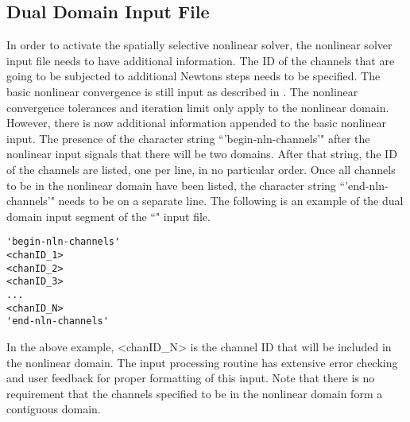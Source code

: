 \subsection{Dual Domain Input File}
\label{subsect:domDecompInputFile}

In order to activate the spatially selective nonlinear solver, the nonlinear solver input file needs to have additional information.
The ID of the channels that are going to be subjected to additional Newtons steps needs to be specified.
The basic nonlinear convergence is still input as described in .
The nonlinear convergence tolerances and iteration limit only apply to the nonlinear domain.
However, there is now additional information appended to the basic nonlinear input.
The presence of the character string ``'begin-nln-channels'" after the nonlinear input signals that there will be two domains.
After that string, the ID of the channels are listed, one per line, in no particular order.
Once all channels to be in the nonlinear domain have been listed, the character string ``'end-nln-channels'" needs to be on a separate line.
The following is an example of the dual domain input segment of the ``" input file.

{
\singlespace
\begin{verbatim}
'begin-nln-channels'
<chanID_1>
<chanID_2>
<chanID_3>
...
<chanID_N>
'end-nln-channels'
\end{verbatim}
}

In the above example, <chanID\_N> is the channel ID that will be included in the nonlinear domain.
The input processing routine has extensive error checking and user feedback for proper formatting of this input.
Note that there is no requirement that the channels specified to be in the nonlinear domain form a contiguous domain.


